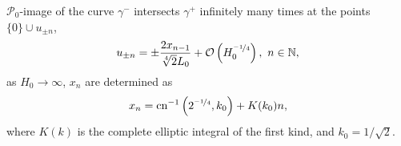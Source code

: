 \begin{proposition}
	$\mathcal{P}_0$-image of the curve $\gamma^-$ intersects $\gamma^+$ infinitely many times at the points $\{ 0 \} \cup {u_{\pm n}}$,
	\begin{equation}
		u_{\pm n} = \pm \frac{2 x_{n-1}}{\sqrt[4]{2} L_0} + \mathcal{O} \left( H_0^{\nicefrac{-1}{4}} \right), \ n \in \mathbb{N},
	\label{eq:separatrix-map-un}
	\end{equation}
	as $H_0 \to \infty$, $x_n$ are determined as
	\begin{equation}
		x_n = \mathrm{cn}^{-1} \left( 2^{\nicefrac{-1}{4}}, k_0 \right) + K(k_0) n,
	\label{eq:separatrix-map-xn}
	\end{equation}
	where $K(k)$ is the complete elliptic integral of the first kind, and $k_0 = 1 / \sqrt{2}$. 
\label{prop:separatrix-map}
\end{proposition}
